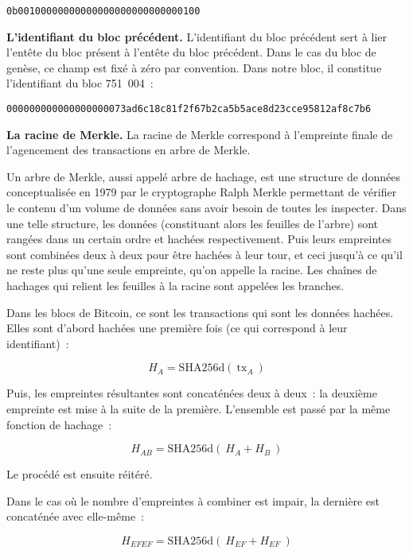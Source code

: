 \begin{Verbatim}[fontsize=\footnotesize]
0b00100000000000000000000000000100
\end{Verbatim}


\textbf{L'identifiant du bloc précédent.} L'identifiant du bloc précédent sert à lier l'entête du bloc présent à l'entête du bloc précédent. Dans le cas du bloc de genèse, ce champ est fixé à zéro par convention. Dans notre bloc, il constitue l'identifiant du bloc 751~004~:

\begin{Verbatim}[fontsize=\footnotesize]
000000000000000000073ad6c18c81f2f67b2ca5b5ace8d23cce95812af8c7b6
\end{Verbatim}


\textbf{La racine de Merkle.} La racine de Merkle correspond à l'empreinte finale de l'agencement des transactions en arbre de Merkle.

Un arbre de Merkle, aussi appelé arbre de hachage, est une structure de données conceptualisée en 1979 par le cryptographe Ralph Merkle permettant de vérifier le contenu d'un volume de données sans avoir besoin de toutes les inspecter. Dans une telle structure, les données (constituant alors les feuilles de l'arbre) sont rangées dans un certain ordre et hachées respectivement. Puis leurs empreintes sont combinées deux à deux pour être hachées à leur tour, et ceci jusqu'à ce qu'il ne reste plus qu'une seule empreinte, qu'on appelle la racine. Les chaînes de hachages qui relient les feuilles à la racine sont appelées les branches.

Dans les blocs de Bitcoin, ce sont les transactions qui sont les données hachées. Elles sont d'abord hachées une première fois (ce qui correspond à leur identifiant)~:

\[
H_A = \mathrm{SHA256d}(~\mathrm{tx}_A~)
\]

Puis, les empreintes résultantes sont concaténées deux à deux~: la deuxième empreinte est mise à la suite de la première. L'ensemble est passé par la même fonction de hachage~:

\[
H_{A\!B} = \mathrm{SHA256d}(~H_A + H_B~)
\]

Le procédé est ensuite réitéré.

Dans le cas où le nombre d'empreintes à combiner est impair, la dernière est concaténée avec elle-même~:

\[
H_{E\!F\!E\!F} = \mathrm{SHA256d}(~H_{E\!F} + H_{E\!F}~)
\]

